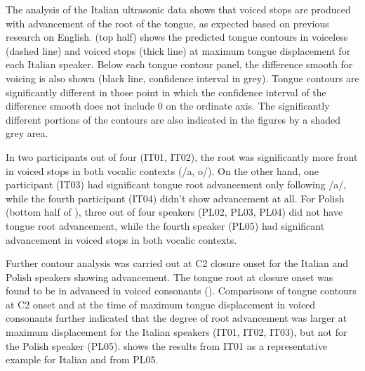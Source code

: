 \documentclass[authoryear, twocolumn]{elsarticle}
\begin{document}
The analysis of the Italian ultrasonic data shows that voiced stops are
produced with advancement of the root of the tongue, as expected based
on previous research on English.  (top half) shows the
predicted tongue contours in voiceless (dashed line) and voiced stops
(thick line) at maximum tongue displacement for each Italian speaker.
Below each tongue contour panel, the difference smooth for voicing is
also shown (black line, confidence interval in grey). Tongue contours
are significantly different in those point in which the confidence
interval of the difference smooth does not include 0 on the ordinate
axis. The significantly different portions of the contours are also
indicated in the figures by a shaded grey area.

In two participants out of four (IT01, IT02), the root was significantly
more front in voiced stops in both vocalic contexts (/a, o/). On the
other hand, one participant (IT03) had significant tongue root
advancement only following /a/, while the fourth participant (IT04)
didn't show advancement at all. For Polish (bottom half of
), three out of four speakers (PL02, PL03, PL04) did not
have tongue root advancement, while the fourth speaker (PL05) had
significant advancement in voiced stops in both vocalic contexts.

Further contour analysis was carried out at C2 closure onset for the
Italian and Polish speakers showing advancement. The tongue root at
closure onset was found to be in advanced in voiced consonants ().
Comparisons of tongue contours at C2 onset and at the time of maximum
tongue displacement in voiced consonants further indicated that the
degree of root advancement was larger at maximum displacement for the
Italian speakers (IT01, IT02, IT03), but not for the Polish speaker
(PL05).  shows the results from IT01 as a representative
example for Italian and from PL05.
\end{document}
